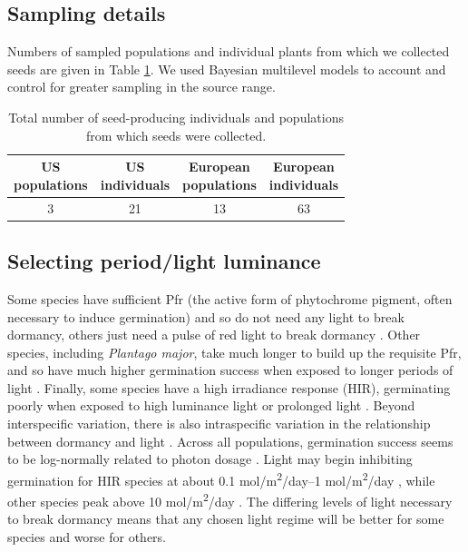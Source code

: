 \documentclass[12pt]{article}\usepackage[]{graphicx}\usepackage[]{color}
\begin{document}
\subsection{Sampling details}
Numbers of sampled populations and individual plants from which we collected seeds are given in Table \ref{tab:seednum}. We used Bayesian multilevel models to account and control for   greater sampling in the source range. %
	\begin{center}
		\begin{table}[H]
			\centering
			\caption {Total number of seed-producing individuals and populations from which seeds were collected.} \label{tab:seeds}  
			\begin{tabular}{c|c|c|c}
				\makecell{\textbf{US} \\ \textbf{populations}} & \makecell{\textbf{US} \\  \textbf{individuals}} & \makecell{\textbf{European} \\ \textbf{populations}} & \makecell{\textbf{European} \\ \textbf{individuals}} \\
				\hline
				3&	21&	13&	63\\
			\end{tabular}
			\label{tab:seednum}
		\end{table}
	\end{center}
	
\subsection{Selecting period/light luminance}
Some species have sufficient Pfr (the active form of phytochrome pigment, often necessary to induce germination) and so do not need any light to break dormancy, others just need a pulse of red light to break dormancy \parencite[the red light converts the inactive phytochrome into Pfr,][]{Casal998}.  Other species, including \textit{Plantago major}, take much longer to build up the requisite Pfr, and so have much higher germination success when exposed to longer periods of light \parencite[with nearly 100\% germination after 48 hours of exposure for \textit{P. major},][]{Pons1991}. Finally, some species have a high irradiance response (HIR), germinating poorly when exposed to high luminance light or prolonged light \parencite{Roberts1987}. Beyond interspecific variation, there is also intraspecific variation in the relationship between dormancy and light \parencite{Probert1986}. Across all populations, germination success seems to be log-normally related to photon dosage \parencite{Ellis1986}. Light may begin inhibiting germination for HIR species at about 0.1 mol/m\textsuperscript{2}/day--1 mol/m\textsuperscript{2}/day \parencite{Baskin1998,Ellis1986}, while other species peak above 10 mol/m\textsuperscript{2}/day \parencite{Ellis1986}. The differing levels of light necessary to break dormancy means that any chosen light regime will be better for some species and worse for others. 
	
\end{document}
